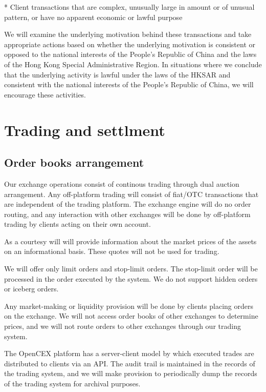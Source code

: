 * Client transactions that are complex, unusually large in amount or
of unusual pattern, or have no apparent economic or lawful purpose

We will examine the underlying motivation behind these transactions
and take appropriate actions based on whether the underlying
motivation is consistent or opposed to the national interests of the
People's Republic of China and the laws of the Hong Kong Special
Administrative Region.  In situations where we conclude that the
underlying activity is lawful under the laws of the HKSAR and
consistent with the national interests of the People's Republic of
China, we will encourage these activities.

\section{Trading and settlment}

\subsection{Order books arrangement}

Our exchange operations consist of continous trading through dual
auction arrangement.  Any off-platform trading will consist of
fiat/OTC transactions that are independent of the trading platform.
The exchange engine will do no order routing, and any interaction with
other exchanges will be done by off-platform trading by clients acting
on their own account.

As a courtesy will will provide information about the market prices of
the assets on an informational basis.  These quotes will not be used
for trading.

We will offer only limit orders and stop-limit orders.  The stop-limit
order will be processed in the order executed by the system.  We do
not support hidden orders or iceberg orders.

Any market-making or liquidity provision will be done by clients
placing orders on the exchange.  We will not access order books of
other exchanges to determine prices, and we will not route orders to
other exchanges through our trading system.

The OpenCEX platform has a server-client model by which executed
trades are distributed to clients via an API.  The audit trail is
maintained in the records of the trading system, and we will make
provision to periodically dump the records of the trading system for
archival purposes.


